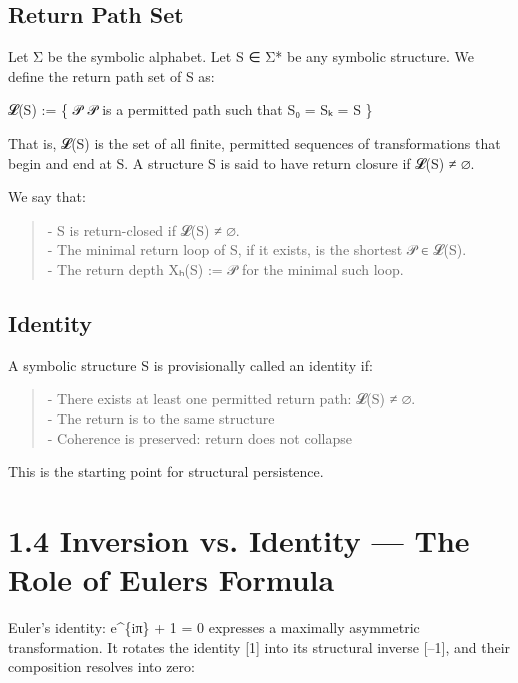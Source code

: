 \subsection{Return Path Set}\label{return-path-set}

Let Σ be the symbolic alphabet. Let S ∈ Σ* be any symbolic structure. We
define the return path set of S as:

𝓛(S) := \{ 𝒫 \textbar{} 𝒫 is a permitted path such that S₀ = Sₖ = S \}

That is, 𝓛(S) is the set of all finite, permitted sequences of
transformations that begin and end at S. A structure S is said to have
return closure if 𝓛(S) ≠ ∅.

We say that:

\begin{quote}
- S is return-closed if 𝓛(S) ≠ ∅.\\
- The minimal return loop of S, if it exists, is the shortest 𝒫 ∈
𝓛(S).\\
- The return depth Xₕ(S) := \textbar 𝒫\textbar{} for the minimal such
loop.
\end{quote}

\subsection{Identity}\label{identity}

A symbolic structure S is provisionally called an identity if:

\begin{quote}
- There exists at least one permitted return path: 𝓛(S) ≠ ∅.\\
- The return is to the same structure\\
- Coherence is preserved: return does not collapse
\end{quote}

This is the starting point for structural persistence.

\section{1.4 \textbar{} Inversion vs. Identity --- The Role of
Euler\textquotesingle s
Formula}\label{inversion-vs.-identity-the-role-of-eulers-formula}

Euler's identity: e\^{}\{iπ\} + 1 = 0 expresses a maximally asymmetric
transformation. It rotates the identity {[}1{]} into its structural
inverse {[}--1{]}, and their composition resolves into zero:

